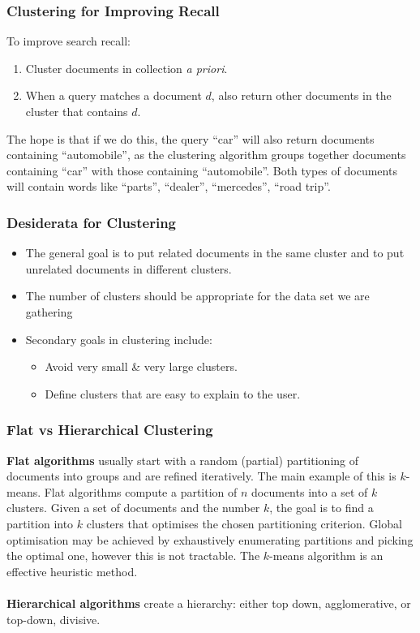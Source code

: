 \documentclass[a4paper,11pt]{article}
\begin{document}
\subsubsection{Clustering for Improving Recall}
To improve search recall:
\begin{enumerate}
    \item   Cluster documents in collection \textit{a priori}.
    \item   When a query matches a document $d$, also return other documents in the cluster that contains $d$.
\end{enumerate}

The hope is that if we do this, the query ``car'' will also return documents containing ``automobile'', as  the clustering algorithm groups together documents containing ``car'' with those containing ``automobile''.
Both types of documents will contain words like ``parts'', ``dealer'', ``mercedes'', ``road trip''.

\subsubsection{Desiderata for Clustering}
\begin{itemize}
    \item   The general goal is to put related documents in the same cluster and to put unrelated documents in different clusters.
    \item   The number of clusters should be appropriate for the data set we are gathering
    \item   Secondary goals in clustering include:
            \begin{itemize}
                \item   Avoid very small \& very large clusters.
                \item   Define clusters that are easy to explain to the user.
            \end{itemize}
\end{itemize}

\subsubsection{Flat vs Hierarchical Clustering}
\textbf{Flat algorithms} usually start with a random (partial) partitioning of documents into groups and are refined iteratively.
The main example of this is $k$-means.
Flat algorithms compute a partition of $n$ documents into a set of $k$ clusters.
Given a set of documents and the number $k$, the goal is to find a partition into $k$ clusters that optimises the chosen partitioning criterion.
Global optimisation may be achieved by exhaustively enumerating partitions and picking the optimal one, however this is not tractable.
The $k$-means algorithm is an effective heuristic method.
\\\\
\textbf{Hierarchical algorithms} create a hierarchy: either top down, agglomerative, or top-down, divisive.
\end{document}
